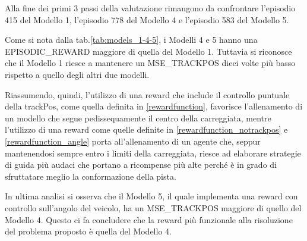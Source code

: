 Alla fine dei primi 3 passi della valutazione rimangono da confrontare l'episodio 415 del Modello 1, l'episodio 778 del Modello 4 e l'episodio 583 del Modello 5.

\clearpage

Come si nota dalla tab.\ref{tab:models_1-4-5}, i Modelli 4 e 5 hanno una EPISODIC\_REWARD maggiore di quella del Modello 1. Tuttavia si riconosce che il Modello 1 riesce a mantenere un MSE\_TRACKPOS dieci volte più basso rispetto a quello degli altri due modelli.
\newline

Riassumendo, quindi, l'utilizzo di una reward che include il controllo puntuale della trackPos, come quella definita in \ref{rewardfunction}, favorisce l'allenamento di un modello che segue pedissequamente il centro della carreggiata, mentre l'utilizzo di una reward come quelle definite in \ref{rewardfunction_notrackpos} e \ref{rewardfunction_angle} porta all'allenamento di un agente che, seppur mantenendosi sempre entro i limiti della carreggiata, riesce ad elaborare strategie di guida più audaci che portano a ricompense più alte perché è in grado di sfruttatare meglio la conformazione della pista.
\newline

In ultima analisi si osserva che il Modello 5, il quale implementa una reward con controllo sull'angolo del veicolo, ha un MSE\_TRACKPOS maggiore di quello del Modello 4. Questo ci fa concludere che la reward più funzionale alla risoluzione del problema proposto è quella del Modello 4.

\begin{table}[hb]
\centering
{}
\caption{Confronto Modelli 1, 4 e 5}
\label{tab:models_1-4-5}
\end{table}

